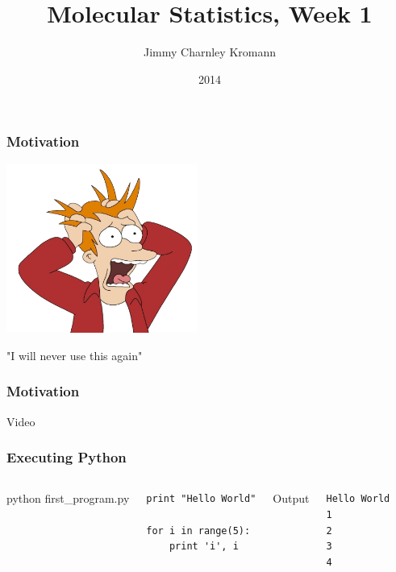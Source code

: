 \documentclass{beamer}
\title[]{Molecular Statistics, Week 1}
\institute[University of Copenhagen]{Department of Chemistry \\ University of Copenhagen}
\author[Jimmy Charnley Kromann]{Jimmy Charnley Kromann}
\date{2014}
\begin{document}
\frame[plain]{\titlepage}


\begin{frame}[fragile]

    \frametitle{Motivation}

    \begin{center}
        \includegraphics[width=0.47\textwidth]{panic.png}

        "I will never use this again"

    \end{center}

\end{frame}


\begin{frame}[fragile]

    \frametitle{Motivation}

    \begin{center}
        Video
    \end{center}

\end{frame}


\begin{frame}[fragile]

    \frametitle{Executing Python}

    \begin{columns}[t]


            \begin{center}
                python first\_program.py
            \end{center}

\begin{lstlisting}
print "Hello World"

for i in range(5):
    print 'i', i
\end{lstlisting}


            \begin{center}
                Output
            \end{center}

\begin{lstlisting}
Hello World
1
2
3
4
\end{lstlisting}


    \end{columns}


\end{frame}
\end{document}

